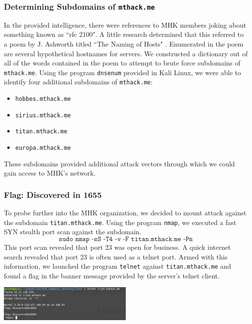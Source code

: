 \documentclass[10pt,a4paper,titlepage]{article}
\begin{document}
\subsubsection{Determining Subdomains of \texttt{mthack.me}}
In the provided intelligence\cite{test}, there were references to MHK members joking about something known as ``rfc 2100". A little research determined that this referred to a poem by J. Ashworth titled ``The Naming of Hosts" \cite{rfc}. Enumerated in the poem are several hypothetical hostnames for servers. We constructed a dictionary out of all of the words contained in the poem to attempt to brute force subdomains of \texttt{mthack.me}. Using the program \texttt{dnsenum} provided in Kali Linux, we were able to identify four additional subdomains of \texttt{mthack.me}:
\begin{itemize}
\item \texttt{hobbes.mthack.me}
\item \texttt{sirius.mthack.me}
\item \texttt{titan.mthack.me}
\item \texttt{europa.mthack.me}
\end{itemize}
These subdomains provided additional attack vectors through which we could gain access to MHK's network.
\subsubsection{Flag: Discovered in 1655}
To probe further into the MHK organization, we decided to mount attack against the subdomain \texttt{titan.mthack.me}. Using the program \texttt{nmap}, we executed a fast SYN stealth port scan against the subdomain. 
\[ \texttt{sudo nmap -sS -T4 -v -F titan.mthack.me -Pn} \]
This port scan revealed that port 23 was open for business. A quick internet search revealed that port 23 is often used as a telnet port. Armed with this information, we launched the program \texttt{telnet} against \texttt{titan.mthack.me} and found a flag in the banner message provided by the server's telnet client.
\begin{center}
\includegraphics[width=0.5\textwidth]{titan_flags/DiscoveredIn1655/flag}
\end{center}
\end{document}
